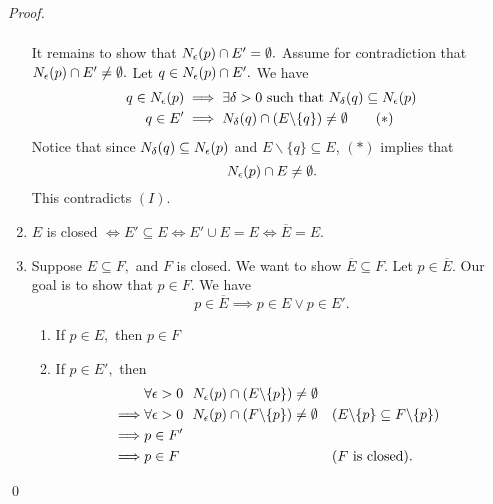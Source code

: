 \begin{proof}
\begin{enumerate}[$(i)$]
\begin{align*}
        \end{align*}
        It remains to show that $N_{\epsilon}(p)\cap E' = \emptyset.$ Assume for contradiction that $N_{\epsilon}(p) \cap E' \not = \emptyset.$ Let $q \in N_{\epsilon}(p) \cap E'.$ We have
        \begin{align*}
            q\in N_{\epsilon}(p) &\implies \exists \delta > 0 \text{ such that } N_{\delta}(q) \subseteq N_{\epsilon}(p) \\
            q \in E' &\implies N_{\delta}(q)\cap \left(E \backslash \{q\}\right) \not = \emptyset \tag{$*$}
        \end{align*}
        Notice that since $N_{\delta}(q) \subseteq N_{\epsilon}(p)$ and $E \backslash \{q\} \subseteq E$, $(*)$ implies that 
        $$N_{\epsilon}(p)\cap E \not = \emptyset.$$
        This contradicts $(I)$.

        \item $E$ is closed $\iff E' \subseteq E \iff E' \cup E = E \iff \overline{E} = E.$

        \item Suppose $E\subseteq F,$ and $F$ is closed. We want to show $\overline{E} \subseteq F$. Let $p \in \overline{E}$. Our goal is to show that $p \in F.$ We have
        $$p\in \overline{E} \implies p \in E \vee p \in E'.$$
        \begin{enumerate}[$*$]
            \item If $p\in E,$ then $p\in F$
            \item If $p\in E',$ then 
            \begin{align*}
                &\forall \epsilon > 0 ~~N_{\epsilon}(p)\cap \left(E \backslash \{p\}\right) \not = \emptyset \\
                \implies &\forall \epsilon > 0 ~~N_{\epsilon}(p) \cap \left(F \backslash \{p\}\right) \not = \emptyset &&(E \backslash \{p\} \subseteq F \backslash \{p\}) \\
                \implies &p\in F' \\
                \implies &p \in F &&(F \text{ is closed}).
            \end{align*}
        \end{enumerate}
    \end{enumerate}
    \qed
\end{proof}